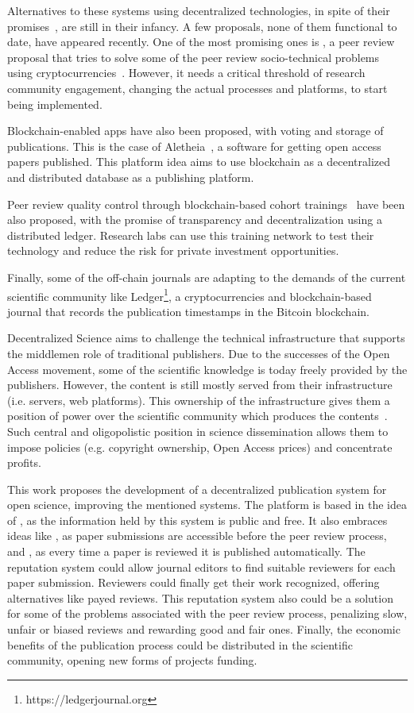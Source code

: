 Alternatives to these systems using decentralized technologies, in spite of
their promises~\cite{bartlingblockchain}, are still in their infancy. A few
proposals, none of them functional to date, have appeared recently. One of the
most promising ones is , a peer review proposal that tries to solve
some of the peer review socio-technical problems using
cryptocurrencies~\cite{tennant2017multi}. However, it needs a critical threshold
of research community engagement, changing the actual processes and platforms,
to start being implemented.

Blockchain-enabled apps have also been proposed, with voting and storage of
publications. This is the case of Aletheia~\cite{morton2017aletheia}, a software
for getting open access papers published. This platform idea aims to use
blockchain as a decentralized and distributed database as a publishing platform.

Peer review quality control through blockchain-based cohort
trainings~\cite{dhillon2016bench} have been also proposed, with the promise of
transparency and decentralization using a distributed ledger. Research labs can
use this training network to test their technology and reduce the risk for
private investment opportunities.

Finally, some of the off-chain journals are adapting to the demands of the
current scientific community like Ledger\footnote{https://ledgerjournal.org}, a
cryptocurrencies and blockchain-based journal that records the publication
timestamps in the Bitcoin blockchain.

Decentralized Science aims to challenge the technical infrastructure that
supports the middlemen role of traditional publishers. Due to the successes of
the Open Access movement, some of the scientific knowledge is today freely
provided by the publishers. However, the content is still mostly served from
their infrastructure (i.e. servers, web platforms). This ownership of the
infrastructure gives them a position of power over the scientific community
which produces the contents~\cite{fuster2010governance}. Such central and
oligopolistic position in science dissemination allows them to impose policies
(e.g. copyright ownership, Open Access prices) and concentrate profits.

This work proposes the development of a decentralized publication system for
open science, improving the mentioned systems. The platform is based in the idea
of , as the information held by this system is public and free.
It also embraces ideas like , as paper submissions are accessible
before the peer review process, and , as every time a
paper is reviewed it is published automatically. The reputation system could
allow journal editors to find suitable reviewers for each paper submission.
Reviewers could finally get their work recognized, offering alternatives like
payed reviews. This reputation system also could be a solution for some of the
problems associated with the peer review process, penalizing slow, unfair or
biased reviews and rewarding good and fair ones. Finally, the economic benefits
of the publication process could be distributed in the scientific community,
opening new forms of projects funding.


